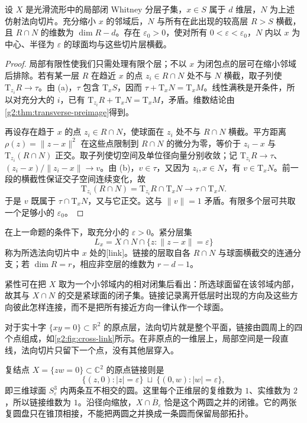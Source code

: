 \begin{proposition}\label{g2:prop:normal-slice-link}
	设 \(X\) 是光滑流形中的局部闭 Whitney 分层子集，\(x\in S\) 属于 \(d\) 维层，\(N\) 为上述仿射法向切片。充分缩小 \(x\) 的邻域后，\(N\) 与所有在此出现的较高层 \(R>S\) 横截，且 \(R\cap N\) 的维数为 \(\dim R-d\)。存在 \(\varepsilon_0>0\)，使对所有 \(0<\varepsilon<\varepsilon_0\)，\(N\) 内以 \(x\) 为中心、半径为 \(\varepsilon\) 的球面均与这些切片层横截。
\end{proposition}
\begin{proof}
	局部有限性使我们只需处理有限个层；不以 \(x\) 为闭包点的层可在缩小邻域后排除。若有某一层 \(R\) 在趋近 \(x\) 的点 \(z_i\in R\cap N\) 处不与 \(N\) 横截，取子列使 \(\mathrm T_{z_i}R\to\tau\)。由 (a)，\(\tau\) 包含 \(\mathrm T_xS\)，因而 \(\tau+\mathrm T_xN=\mathrm T_xM\)。线性满秩是开条件，所以对充分大的 \(i\)，已有 \(\mathrm T_{z_i}R+\mathrm T_xN=\mathrm T_xM\)，矛盾。维数结论由\cref{g2:thm:transverse-preimage}得到。

	再设存在趋于 \(x\) 的点 \(z_i\in R\cap N\)，使球面在 \(z_i\) 处不与 \(R\cap N\) 横截。平方距离 \(\rho(z)=\lVert z-x\rVert^2\) 在这些点限制到 \(R\cap N\) 的微分为零，等价于 \(z_i-x\) 与 \(\mathrm T_{z_i}(R\cap N)\) 正交。取子列使切空间及单位径向量分别收敛；记 \(\mathrm T_{z_i}R\to\tau\)、\((z_i-x)/\lVert z_i-x\rVert\to v\)。由 (b)，\(v\in\tau\)，又因为 \(z_i,x\in N\)，有 \(v\in\mathrm T_xN\)。前一段的横截性保证交子空间连续变化，故
	\[
		\mathrm T_{z_i}(R\cap N)=\mathrm T_{z_i}R\cap\mathrm T_xN
		\longrightarrow\tau\cap\mathrm T_xN.
	\]
	于是 \(v\) 既属于 \(\tau\cap\mathrm T_xN\)，又与它正交。这与 \(\lVert v\rVert=1\) 矛盾。有限多个层可共取一个足够小的 \(\varepsilon_0\)。
\end{proof}

\begin{definition}\label{g2:def:stratum-link}
	在上一命题的条件下，取充分小的 \(\varepsilon>0\)。紧分层集
	\[
		L_x=X\cap N\cap\{z:\lVert z-x\rVert=\varepsilon\}
	\]
	称为所选法向切片中 \(x\) 处的[link]。链接的层取自各 \(R\cap N\) 与球面横截交的连通分支；若 \(\dim R=r\)，相应非空层的维数为 \(r-d-1\)。
\end{definition}

紧性可在把 \(X\) 取为一个小邻域内的相对闭集后看出：所选球面留在该邻域内部，故其与 \(X\cap N\) 的交是紧球面的闭子集。链接记录离开低层时出现的方向及这些方向彼此怎样连接，而不是把所有接近方向一律认作一个球面。

\begin{example}\label{g2:exm:node-link}
	对于实十字 \(\{xy=0\}\subset\mathbb R^2\) 的原点层，法向切片就是整个平面，链接由圆周上的四个点组成，如\cref{g2:fig:cross-link}所示。在非原点的一维层上，局部空间是一段直线，法向切片只留下一个点，没有其他层穿入。

	复结点 \(X=\{zw=0\}\subset\mathbb C^2\) 的原点链接则是
	\[
		\{(z,0):|z|=\varepsilon\}\ \sqcup\ \{(0,w):|w|=\varepsilon\},
	\]
	即三维球面 \(S^3_\varepsilon\) 内两条互不相交的圆。这里每个正维层的复维数为 \(1\)、实维数为 \(2\)，所以链接维数为 \(1\)。沿径向缩放，\(X\cap\overline B_\varepsilon\) 恰是这个两圆之并的闭锥。它的两张复圆盘只在锥顶相接，不能把两圆之并换成一条圆而保留局部拓扑。
\end{example}

